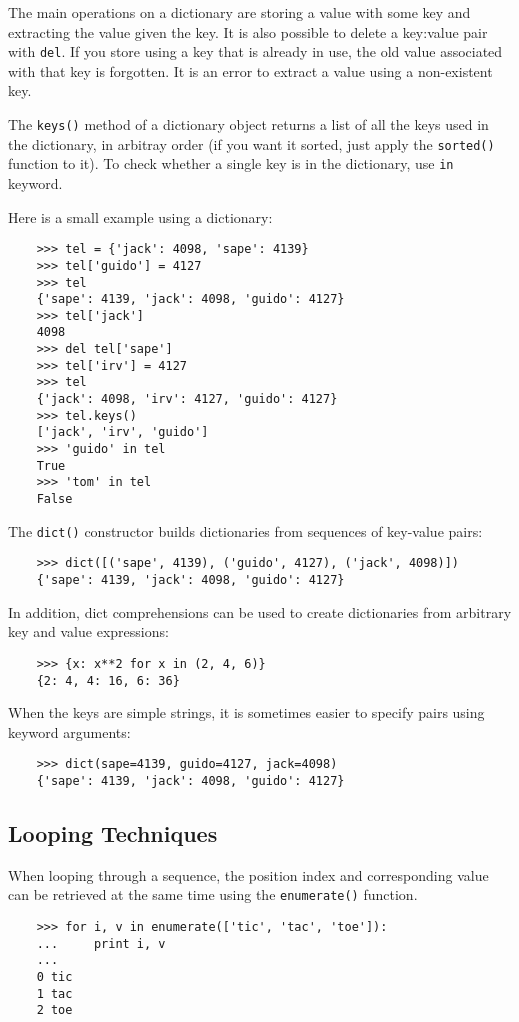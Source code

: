 \documentclass[UTF8]{article}
\begin{document}
The main operations on a dictionary are storing a value with some key and extracting the value
given the key. It is also possible to delete a key:value pair with \texttt{del}. If you store using
a key that is already in use, the old value associated with that key is forgotten. It is an error
to extract a value using a non-existent key.

The \texttt{keys()} method of a dictionary object returns a list of all the keys used in the
dictionary, in arbitray order (if you want it sorted, just apply the \texttt{sorted()} function to
it). To check whether a single key is in the dictionary, use \texttt{in} keyword.

Here is a small example using a dictionary:
\begin{verbatim}
    >>> tel = {'jack': 4098, 'sape': 4139}
    >>> tel['guido'] = 4127
    >>> tel
    {'sape': 4139, 'jack': 4098, 'guido': 4127}
    >>> tel['jack']
    4098
    >>> del tel['sape']
    >>> tel['irv'] = 4127
    >>> tel
    {'jack': 4098, 'irv': 4127, 'guido': 4127}
    >>> tel.keys()
    ['jack', 'irv', 'guido']
    >>> 'guido' in tel
    True
    >>> 'tom' in tel
    False
\end{verbatim}

The \texttt{dict()} constructor builds dictionaries from sequences of key-value pairs:
\begin{verbatim}
    >>> dict([('sape', 4139), ('guido', 4127), ('jack', 4098)])
    {'sape': 4139, 'jack': 4098, 'guido': 4127}
\end{verbatim}

In addition, dict comprehensions can be used to create dictionaries from arbitrary key and value
expressions:
\begin{verbatim}
    >>> {x: x**2 for x in (2, 4, 6)}
    {2: 4, 4: 16, 6: 36}
\end{verbatim}

When the keys are simple strings, it is sometimes easier to specify pairs using keyword arguments:
\begin{verbatim}
    >>> dict(sape=4139, guido=4127, jack=4098)
    {'sape': 4139, 'jack': 4098, 'guido': 4127}
\end{verbatim}

\subsection{Looping Techniques}
When looping through a sequence, the position index and corresponding value can be retrieved at the
same time using the \texttt{enumerate()} function.
\begin{verbatim}
    >>> for i, v in enumerate(['tic', 'tac', 'toe']):
    ...     print i, v
    ...
    0 tic
    1 tac
    2 toe
\end{verbatim}
\end{document}
